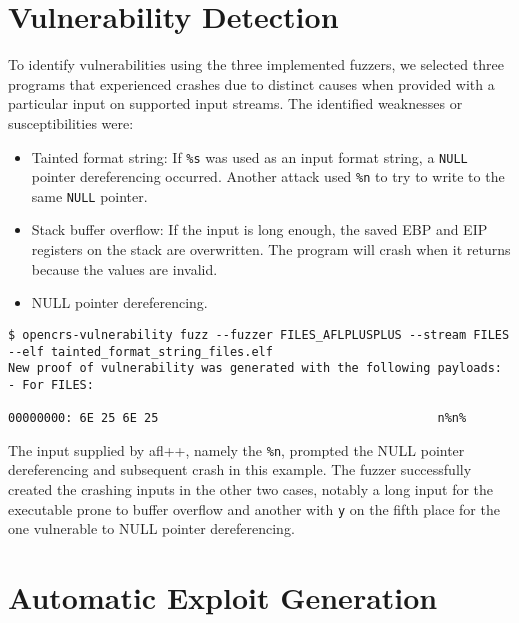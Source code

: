 \documentclass[../main.tex]{subfiles}
\begin{document}
\hypertarget{vulnerability-detection}{%
  \section{Vulnerability Detection}\label{vulnerability-detection}}

To identify vulnerabilities using the three implemented fuzzers, we selected
three programs that experienced crashes due to distinct causes when provided
with a particular input on supported input streams. The identified weaknesses
or susceptibilities were:

\begin{itemize}
  \tightlist
  \item
        Tainted format string: If \texttt{\%s} was used as an input format
        string, a \texttt{NULL} pointer dereferencing occurred. Another attack
        used \texttt{\%n} to try to write to the same \texttt{NULL} pointer.
  \item
        Stack buffer overflow: If the input is long enough, the saved EBP and
        EIP registers on the stack are overwritten. The program will crash
        when it returns because the values are invalid.
  \item
        NULL pointer dereferencing.
\end{itemize}

\begin{tiny}
\begin{verbatim}
$ opencrs-vulnerability fuzz --fuzzer FILES_AFLPLUSPLUS --stream FILES --elf tainted_format_string_files.elf
New proof of vulnerability was generated with the following payloads:
- For FILES:

00000000: 6E 25 6E 25                                       n%n%
\end{verbatim}
\end{tiny}

The input supplied by afl++, namely the \texttt{\%n}, prompted the NULL pointer
dereferencing and subsequent crash in this example. The fuzzer successfully
created the crashing inputs in the other two cases, notably a long input for
the executable prone to buffer overflow and another with \texttt{y} on the
fifth place for the one vulnerable to NULL pointer dereferencing.

\hypertarget{automatic-exploit-generation}{%
  \section{Automatic Exploit
    Generation}\label{automatic-exploit-generation}}
\end{document}
